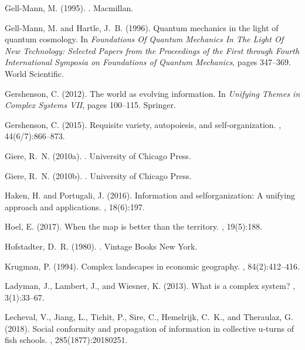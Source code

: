\documentclass[graybox]{svmult}
\begin{document}
\begin{thebibliography}{}
Gell-Mann, M. (1995).
.
\newblock Macmillan.

Gell-Mann, M. and Hartle, J.~B. (1996).
\newblock Quantum mechanics in the light of quantum cosmology.
\newblock In {\em Foundations Of Quantum Mechanics In The Light Of New
  Technology: Selected Papers from the Proceedings of the First through Fourth
  International Symposia on Foundations of Quantum Mechanics}, pages 347--369.
  World Scientific.

Gershenson, C. (2012).
\newblock The world as evolving information.
\newblock In {\em Unifying Themes in Complex Systems VII}, pages 100--115.
  Springer.

Gershenson, C. (2015).
\newblock Requisite variety, autopoiesis, and self-organization.
, 44(6/7):866--873.

Giere, R.~N. (2010a).
.
\newblock University of Chicago Press.

Giere, R.~N. (2010b).
.
\newblock University of Chicago Press.

Haken, H. and Portugali, J. (2016).
\newblock Information and selforganization: A unifying approach and
  applications.
, 18(6):197.

Hoel, E. (2017).
\newblock When the map is better than the territory.
, 19(5):188.

Hofstadter, D.~R. (1980).
.
\newblock Vintage Books New York.

Krugman, P. (1994).
\newblock Complex landscapes in economic geography.
, 84(2):412--416.

Ladyman, J., Lambert, J., and Wiesner, K. (2013).
\newblock What is a complex system?
, 3(1):33--67.

Lecheval, V., Jiang, L., Tichit, P., Sire, C., Hemelrijk, C.~K., and Theraulaz,
  G. (2018).
\newblock Social conformity and propagation of information in collective
  u-turns of fish schools.
, 285(1877):20180251.


\end{thebibliography}
\end{document}
